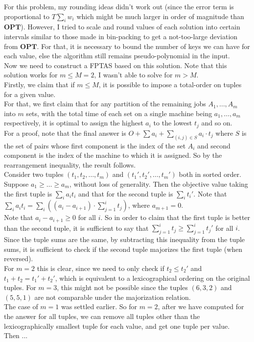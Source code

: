 \documentclass[a4paper]{article}
\newcommand{\nl}{\vspace{0.2cm}\\}
\newcommand{\OPT}{\mathbf{OPT}}
\begin{document}
For this problem, my rounding ideas didn't work out (since the error term is proportional to $T \sum_i w_i$ which might be much larger in order of magnitude than $\OPT$). However, I tried to scale and
round values of each solution into certain intervals similar to those made in bin-packing to get a not-too-large deviation from $\OPT$. For that, it is necessary to bound the number of keys we
can have for each value, else the algorithm still remains pseudo-polynomial in the input.\nl
Now we need to construct a FPTAS based on this solution. Note that this solution works for $m \le M = 2$, I wasn't able to solve for $m > M$.\nl
Firstly, we claim that if $m \le M$, it is possible to impose a total-order on tuples for a given value.\nl
For that, we first claim that for any partition of the remaining jobs $A_1, \ldots, A_m$ into $m$ sets, with the total time of each set on a single machine being $a_1, \ldots, a_m$
respectively, it is optimal to assign the highest $a_i$ to the lowest $t_j$ and so on.\nl
For a proof, note that the final answer is $O + \sum a_i + \sum_{(i, j) \in S} a_i \cdot t_j$ where $S$ is the set of pairs whose first component is the index of the set $A_i$ and second component is
the index of the machine to which it is assigned. So by the rearrangement inequality, the result follows.\nl
Consider two tuples $(t_1, t_2, \ldots, t_m)$ and $(t_1', t_2', \ldots, t_m')$ both in sorted order. Suppose $a_1 \ge \ldots \ge a_m$, without loss of generality. Then the objective value taking
the first tuple is $\sum_i a_i t_i$ and that for the second tuple is $\sum_i t_i'$. Note that $\sum_i a_i t_i = \sum_i \left((a_i - a_{i+1}) \cdot \sum_{j = 1}^i t_j\right)$, where $a_{m+1}
= 0$.\nl
Note that $a_i - a_{i+1} \ge 0$ for all $i$. So in order to claim that the first tuple is better than the second tuple, it is sufficient to say that $\sum_{j = 1}^i t_j \ge \sum_{j = 1}^i t_j'$
for all $i$. Since the tuple sums are the same, by subtracting this inequality from the tuple sums, it is sufficient to check if the second tuple majorizes the first tuple (when reversed).\nl
For $m = 2$ this is clear, since we need to only check if $t_2 \le t_2'$ and $t_1 + t_2 = t_1' + t_2'$, which is equivalent to a lexicographical ordering on the original tuples. For $m = 3$, this
might not be possible since the tuples $(6, 3, 2)$ and $(5, 5, 1)$ are not comparable under the majorization relation.\nl
The case of $m = 1$ was settled earlier. So for $m = 2$, after we have computed for the answer for all tuples, we can remove all tuples other than the lexicographically smallest tuple for each
value, and get one tuple per value.\nl
Then ...
\end{document}
